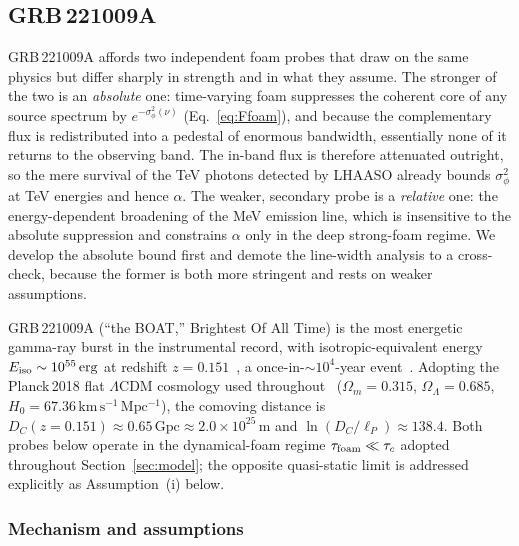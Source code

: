 \documentclass[aps,prd,onecolumn,amsmath,amssymb]{revtex4-2}
\begin{document}
\subsection{GRB\,221009A}
\label{sec:grb221009a}

GRB\,221009A affords two independent foam probes that draw on the same
physics but differ sharply in strength and in what they assume.  The
stronger of the two is an \emph{absolute} one: time-varying foam
suppresses the coherent core of any source spectrum by
$e^{-\sigma_\phi^2(\nu)}$ (Eq.~\eqref{eq:Ffoam}), and because the
complementary flux is redistributed into a pedestal of enormous
bandwidth, essentially none of it returns to the observing band.  The
in-band flux is therefore attenuated outright, so the mere survival of
the TeV photons detected by LHAASO already bounds $\sigma_\phi^2$ at TeV
energies and hence $\alpha$.  The weaker, secondary probe is a
\emph{relative} one: the energy-dependent broadening of the MeV
emission line, which is insensitive to the absolute suppression and
constrains $\alpha$ only in the deep strong-foam regime.  We develop the
absolute bound first and demote the line-width analysis to a
cross-check, because the former is both more stringent and rests on
weaker assumptions.

GRB\,221009A (``the BOAT,'' Brightest Of All Time) is the most
energetic gamma-ray burst in the instrumental record, with
isotropic-equivalent energy $E_{\rm iso}\sim10^{55}\,\mathrm{erg}$ at
redshift $z=0.151$~\cite{Ravasio2024}, a once-in-$\sim10^4$-year event~\cite{Burns2023}.
Adopting the Planck\,2018 flat $\Lambda$CDM cosmology used throughout~\cite{Aghanim2020}
($\Omega_m=0.315$, $\Omega_\Lambda=0.685$,
$H_0=67.36\,\mathrm{km\,s^{-1}\,Mpc^{-1}}$), the comoving distance is
$D_C(z=0.151)\approx0.65\,\mathrm{Gpc}\approx2.0\times10^{25}\,\mathrm{m}$
and $\ln(D_C/\ell_P)\approx138.4$.  Both probes below operate in the
dynamical-foam regime $\tau_{\rm foam}\ll\tau_c$ adopted throughout
Section~\ref{sec:model}; the opposite quasi-static limit is addressed
explicitly as Assumption~(i) below.

\subsubsection{Mechanism and assumptions}
\label{sec:grb_mechanism}
\end{document}
